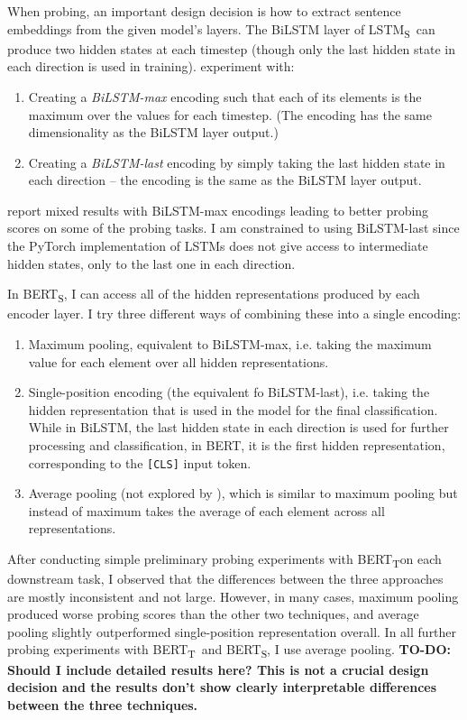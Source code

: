 \documentclass[bsc,frontabs,twoside,singlespacing,parskip,deptreport]{infthesis}
\def\BERTT{BERT\textsubscript{T}}
\def\BERTS{BERT\textsubscript{S}}
\def\LSTMS{LSTM\textsubscript{S}}
\begin{document}
{{{      When probing, an important design decision is how to extract sentence embeddings from the given model's layers.
      The BiLSTM layer of \LSTMS~can produce two hidden states at each timestep (though only the last hidden state in each direction is used in training). \citeauthor{Conneau_2018} experiment with:
      \begin{enumerate}
        \item Creating a \textit{BiLSTM-max} encoding such that each of its elements is the maximum over the values for each timestep. (The encoding has the same dimensionality as the BiLSTM layer output.)
        \item Creating a \textit{BiLSTM-last} encoding by simply taking the last hidden state in each direction -- the encoding is the same as the BiLSTM layer output.
      \end{enumerate}
      \citeauthor{Conneau_2018} report mixed results with BiLSTM-max encodings leading to better probing scores on some of the probing tasks. I am constrained to using BiLSTM-last since the PyTorch implementation of LSTMs does not give access to intermediate hidden states, only to the last one in each direction.

      In \BERTS, I can access all of the hidden representations produced by each encoder layer. I try three different ways of combining these into a single encoding:
      \begin{enumerate}
        \item Maximum pooling, equivalent to BiLSTM-max, i.e. taking the maximum value for each element over all hidden representations.
        \item Single-position encoding (the equivalent fo BiLSTM-last), i.e. taking the hidden representation that is used in the model for the final classification. While in BiLSTM, the last hidden state in each direction is used for further processing and classification, in BERT, it is the first hidden representation, corresponding to the \verb|[CLS]| input token.
        \item Average pooling (not explored by \citeauthor{Conneau_2018}), which is similar to maximum pooling but instead of maximum takes the average of each element across all representations.
      \end{enumerate}
      After conducting simple preliminary probing experiments with \BERTT on each downstream task, I observed that the differences between the three approaches are mostly inconsistent and not large. However, in many cases, maximum pooling produced worse probing scores than the other two techniques, and average pooling slightly outperformed single-position representation overall. In all further probing experiments with \BERTT~and \BERTS, I use average pooling. \textbf{TO-DO: Should I include detailed results here? This is not a crucial design decision and the results don't show clearly interpretable differences between the three techniques.}

}}}
\end{document}
